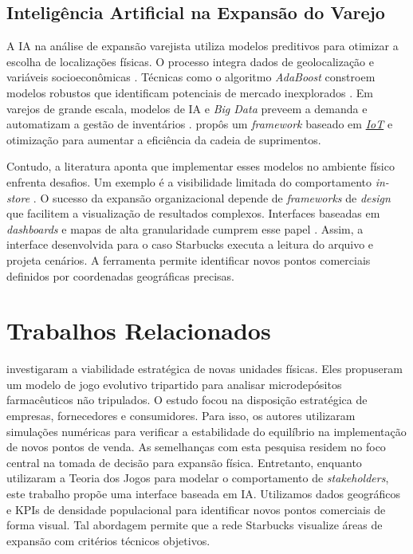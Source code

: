 \subsection{\esp Inteligência Artificial na Expansão do Varejo} \label{subsec:ia_varejo}
A IA na análise de expansão varejista utiliza modelos preditivos para otimizar a escolha de localizações físicas. O processo integra dados de geolocalização e variáveis socioeconômicas \cite{rajan2024, okorie2024}. Técnicas como o algoritmo \textit{AdaBoost} constroem modelos robustos que identificam potenciais de mercado inexplorados \cite{peri2025, mallela2024}. Em varejos de grande escala, modelos de IA e \textit{Big Data} preveem a demanda e automatizam a gestão de inventários \cite{leung2020}.  propôs um \textit{framework} baseado em \href{https://www.ibm.com/topics/internet-of-things}{\textit{IoT}} e otimização para aumentar a eficiência da cadeia de suprimentos.

Contudo, a literatura aponta que implementar esses modelos no ambiente físico enfrenta desafios. Um exemplo é a visibilidade limitada do comportamento \textit{in-store} \cite{malvankar2023, okorie2024}. O sucesso da expansão organizacional depende de \textit{frameworks} de \textit{design} que facilitem a visualização de resultados complexos. Interfaces baseadas em \textit{dashboards} e mapas de alta granularidade cumprem esse papel \cite{sharda2019}. Assim, a interface desenvolvida para o caso Starbucks executa a leitura do arquivo e projeta cenários. A ferramenta permite identificar novos pontos comerciais definidos por coordenadas geográficas precisas.

\section{\esp Trabalhos Relacionados}

 investigaram a viabilidade estratégica de novas unidades físicas. Eles propuseram um modelo de jogo evolutivo tripartido para analisar microdepósitos farmacêuticos não tripulados. O estudo focou na disposição estratégica de empresas, fornecedores e consumidores. Para isso, os autores utilizaram simulações numéricas para verificar a estabilidade do equilíbrio na implementação de novos pontos de venda. As semelhanças com esta pesquisa residem no foco central na tomada de decisão para expansão física. Entretanto, enquanto  utilizaram a Teoria dos Jogos para modelar o comportamento de \textit{stakeholders}, este trabalho propõe uma interface baseada em IA. Utilizamos dados geográficos e KPIs de densidade populacional para identificar novos pontos comerciais de forma visual. Tal abordagem permite que a rede Starbucks visualize áreas de expansão com critérios técnicos objetivos.


